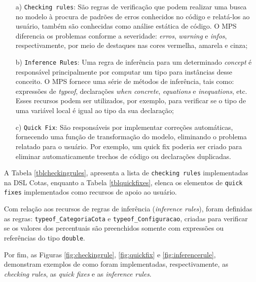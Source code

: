 \begin{enumerate}
 
 \item[a)] \texttt{Checking rules}: São regras de verificação que podem realizar uma busca no modelo à procura de padrões de erros conhecidos no código e relatá-los ao usuário, também são conhecidas como análise estática de código. O \gls{MPS} diferencia os problemas conforme a severidade: \textit{erros}, \textit{warning} e \textit{infos}, respectivamente, por meio de destaques nas cores vermelha, amarela e cinza;
 
 \item[b)]\texttt{Inference Rules}: Uma regra de inferência para um determinado \textit{concept} é responsável principalmente por computar um tipo para instâncias desse conceito. O \gls{MPS} fornece uma série de métodos de inferência, tais como: expressões de \textit{typeof}, declarações \textit{when concrete}, \textit{equations} e \textit{inequations}, etc. Esses recursos podem ser utilizados, por exemplo, para verificar se o tipo de uma variável local é igual ao tipo da sua declaração;
 
 \item[c)]\texttt{Quick Fix}: São responsáveis por implementar correções automáticas, fornecendo uma função de transformação do modelo, eliminando o problema relatado para o usuário. Por exemplo, um quick fix poderia ser criado para eliminar automaticamente trechos de código ou declarações duplicadas.
\end{enumerate}


A Tabela \ref{tblcheckingrules}, apresenta a lista de \texttt{checking rules} implementadas na DSL Cotas, enquanto a Tabela \ref{tblquickfixes}, elenca os elementos de \texttt{quick fixes} implementados como recursos de apoio ao usuário.

\newpage

\newpage



Com relação aos recursos de regras de inferência (\textit{inference rules}), foram definidas as regras: \texttt{typeof\_CategoriaCota} e \texttt{typeof\_Configuracao}, criadas para verificar se os valores dos percentuais são preenchidos somente com expressões ou referências do tipo \texttt{double}.

Por fim, as Figuras \ref{fig:checkingrule}, \ref{fig:quickfix} e \ref{fig:inferencerule}, demonstram exemplos de como foram implementadas, respectivamente, as \textit{checking rules}, as \textit{quick fixes} e as \textit{inference rules}. 

